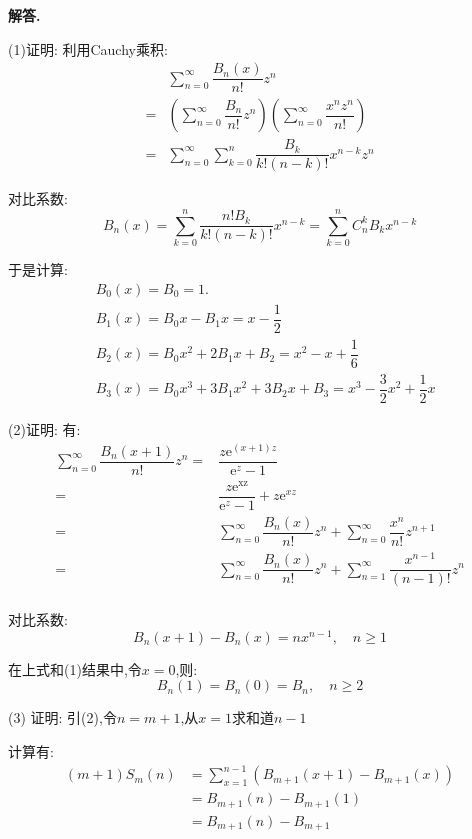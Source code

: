 \documentclass[12pt, a4paper, oneside]{ctexart}
\newenvironment{solution}{\par\noindent\textbf{解答. }}{\par}
\begin{document}
\begin{solution}
\par
(1)证明:
利用Cauchy乘积:
$$
\begin{aligned}
&\sum_{n=0}^{\infty}\dfrac{B_n(x)}{n!}z^n\\
=&\left(\sum_{n=0}^{\infty}\dfrac{B_n}{n!}z^n\right)
\left(\sum_{n=0}^{\infty}\dfrac{x^nz^n}{n!}\right)\\
=&\sum_{n=0}^{\infty}\sum_{k=0}^{n}\dfrac{B_k}{k!(n-k)!}x^{n-k}z^n
\end{aligned}
$$
\par
对比系数:
$$
B_n(x)=\sum_{k=0}^{n}\dfrac{n!B_k}{k!(n-k)!}x^{n-k}=\sum_{k=0}^{n}C_n^kB_kx^{n-k}
$$
\par
于是计算:
$$
\begin{aligned}
&B_0(x)=B_0=1.\\
&B_1(x)=B_0x-B_1x=x-\dfrac{1}{2}\\
&B_2(x)=B_0x^2+2B_1x+B_2=x^2-x+\dfrac{1}{6}\\
&B_3(x)=B_0x^3+3B_1x^2+3B_2x+B_3=x^3-\dfrac{3}{2}x^2+\dfrac{1}{2}x
\end{aligned}
$$
\par
(2)证明:
有:
$$
\begin{aligned}
\sum_{n=0}^{\infty}\dfrac{B_n(x+1)}{n!}z^n
=&\dfrac{z\mathrm{e}^{(x+1)z}}{\mathrm{e}^z-1}\\
=&\dfrac{z\mathrm{e^{xz}}}{\mathrm{e}^z-1}+z\mathrm{e}^{xz}\\
=&\sum_{n=0}^{\infty}\dfrac{B_n(x)}{n!}z^n+\sum_{n=0}^{\infty}\dfrac{x^n}{n!}z^{n+1}\\
=&\sum_{n=0}^{\infty}\dfrac{B_n(x)}{n!}z^n+\sum_{n=1}^{\infty}\dfrac{x^{n-1}}{(n-1)!}z^{n}\\
\end{aligned}
$$
\par
对比系数:
$$
B_n(x+1)-B_n(x)=nx^{n-1}, \quad n\geqslant 1
$$
\par
在上式和(1)结果中,令$x=0$,则:
$$
B_n(1)=B_n(0)=B_n,\quad n\geqslant 2
$$
\par
(3)
证明:
引(2),令$n=m+1$,从$x=1$求和道$n-1$
\par
计算有:
$$
\begin{aligned}
(m+1)S_m(n)
&=\sum_{x=1}^{n-1}\left(B_{m+1}(x+1)-B_{m+1}(x)\right)\\
&=B_{m+1}(n)-B_{m+1}(1)\\
&=B_{m+1}(n)-B_{m+1}\\
\end{aligned}
$$





\end{solution}
\end{document}
